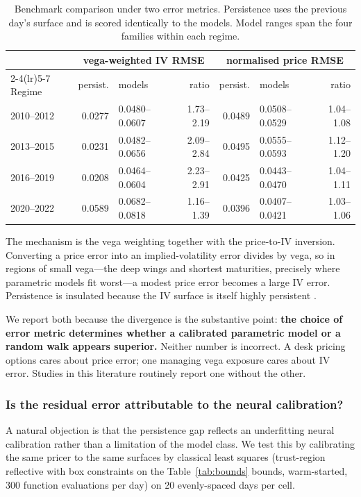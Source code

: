 \documentclass[11pt,a4paper]{article}
\begin{document}
\begin{table}[h]
\centering
\caption{Benchmark comparison under two error metrics. Persistence uses the
previous day's surface and is scored identically to the models. Model ranges
span the four families within each regime.}
\label{tab:benchmark}
\begin{tabular}{lrlrrlr}
\toprule
& \multicolumn{3}{c}{vega-weighted IV RMSE} & \multicolumn{3}{c}{normalised price RMSE} \\
\cmidrule(lr){2-4}\cmidrule(lr){5-7}
Regime & persist. & models & ratio & persist. & models & ratio \\
\midrule
2010--2012 & 0.0277 & 0.0480--0.0607 & 1.73--2.19 & 0.0489 & 0.0508--0.0529 & 1.04--1.08 \\
2013--2015 & 0.0231 & 0.0482--0.0656 & 2.09--2.84 & 0.0495 & 0.0555--0.0593 & 1.12--1.20 \\
2016--2019 & 0.0208 & 0.0464--0.0604 & 2.23--2.91 & 0.0425 & 0.0443--0.0470 & 1.04--1.11 \\
2020--2022 & 0.0589 & 0.0682--0.0818 & 1.16--1.39 & 0.0396 & 0.0407--0.0421 & 1.03--1.06 \\
\bottomrule
\end{tabular}
\end{table}

The mechanism is the vega weighting together with the price-to-IV inversion.
Converting a price error into an implied-volatility error divides by vega, so in
regions of small vega---the deep wings and shortest maturities, precisely where
parametric models fit worst---a modest price error becomes a large IV error.
Persistence is insulated because the IV surface is itself highly persistent
\citep{cont2002}.

We report both because the divergence is the substantive point: \textbf{the
choice of error metric determines whether a calibrated parametric model or a
random walk appears superior.} Neither number is incorrect. A desk pricing
options cares about price error; one managing vega exposure cares about IV
error. Studies in this literature routinely report one without the other.

\subsubsection{Is the residual error attributable to the neural calibration?}
A natural objection is that the persistence gap reflects an underfitting neural
calibration rather than a limitation of the model class. We test this by
calibrating the same pricer to the same surfaces by classical least squares
(trust-region reflective with box constraints on the Table~\ref{tab:bounds}
bounds, warm-started, 300 function evaluations per day) on 20 evenly-spaced days
per cell.
\end{document}
